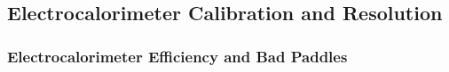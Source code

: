 \subsection{\label{sec:calib.ec}Electrocalorimeter Calibration and Resolution}

\subsubsection{\label{sec:calib.ec.eff}Electrocalorimeter Efficiency and Bad Paddles}

\FloatBarrier
